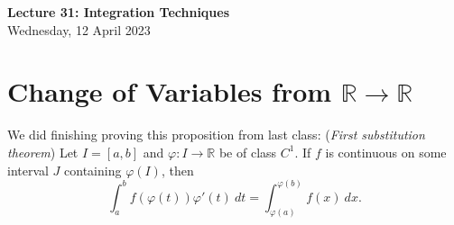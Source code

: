 \documentclass[11pt]{article}
\theoremstyle{definition}
\newcommand{\R}{\mathbb{R}}                      %
\begin{document}
\thispagestyle{empty}

\begin{center}
{\LARGE \bf Lecture 31: Integration Techniques}\\
{\large Wednesday, 12 April 2023}\\
\end{center}

\section{Change of Variables from $\R\to\R$}
We did finishing proving this proposition from last class:
\prop (\textit{First substitution theorem}) Let $I=[a,b]$ and $\varphi:I\to \R$ be of class $C^1$. If $f$ is continuous on some interval $J$ containing $\varphi(I)$, then 
$$
\int_a^b f(\varphi(t))\varphi'(t)~dt=\int_{\varphi(a)}^{\varphi(b)} f(x)~dx.
$$
\end{document}
